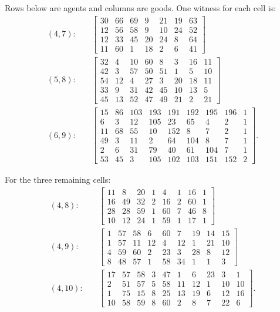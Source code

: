 \documentclass[11pt]{article}
\theoremstyle{plain}
\theoremstyle{definition}
\begin{document}
Rows below are agents and columns are goods.  One witness for each cell is:
\begin{align*}
(4,7):\quad & \begin{bmatrix}
30&66&69& 9&21&19&63\\
12&56&58& 9&10&24&52\\
12&33&45&20&24& 8&64\\
11&60& 1&18& 2& 6&41
\end{bmatrix}
\\[1ex]
(5,8):\quad & \begin{bmatrix}
32& 4&10&60& 8& 3&16&11\\
42& 3&57&50&51& 1& 5&10\\
54&12& 4&27& 3&20&18&11\\
33& 9&31&42&45&10&13& 5\\
45&13&52&47&49&21& 2&21
\end{bmatrix}
\\[1ex]
(6,9):\quad & \begin{bmatrix}
15&86&103&193&191&192&195&196&1\\
 6& 3& 12&105& 23& 65&  4&  2&1\\
11&68& 55& 10&152&  8&  7&  2&1\\
49& 3& 11&  2& 64&104&  8&  7&1\\
 2& 6& 31& 79& 40& 61&104&  7&1\\
53&45&  3&105&102&103&151&152&2
\end{bmatrix}.
\end{align*}

For the three remaining cells:
\begin{align*}
(4,8):\quad &
\begin{bmatrix}
11& 8&20&1& 4&1&16&1\\
16&49&32&2&16&2&60&1\\
28&28&59&1&60&7&46&8\\
10&12&24&1&59&1&17&1
\end{bmatrix}
\\[1ex]
(4,9):\quad & \begin{bmatrix}
1&57&58& 6&60& 7&19&14&15\\
1&57&11&12& 4&12& 1&21&10\\
4&59&60& 2&23& 3&28& 8&12\\
8&48&57& 1&58&34& 1& 1& 3
\end{bmatrix}
\\[1ex]
(4,10):\quad & \begin{bmatrix}
17&57&58&3&47& 1& 6&23& 3& 1\\
 2&51&57&5&58&11&12& 1&10&10\\
 1&75&15&8&25&13&19& 6&12&16\\
10&58&59&8&60& 2& 8& 7&22& 6
\end{bmatrix}.
\end{align*}
\end{document}
